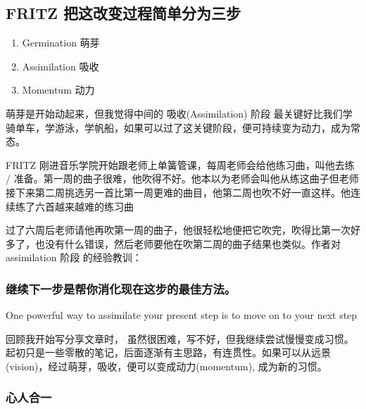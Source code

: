 \hypertarget{fritz-ux628aux8fd9ux6539ux53d8ux8fc7ux7a0bux7b80ux5355ux5206ux4e3aux4e09ux6b65}{%
\subsection{FRITZ
把这改变过程简单分为三步}\label{fritz-ux628aux8fd9ux6539ux53d8ux8fc7ux7a0bux7b80ux5355ux5206ux4e3aux4e09ux6b65}}

\begin{enumerate}
\tightlist
\item
  Germination 萌芽
\item
  Assimilation 吸收
\item
  Momentum 动力
\end{enumerate}

萌芽是开始动起来，但我觉得中间的 吸收(Assimilation) 阶段
最关键好比我们学骑单车，学游泳，学帆船，如果可以过了这关键阶段，便可持续变为动力，成为常态。

FRITZ 刚进音乐学院开始跟老师上单簧管课，每周老师会给他练习曲，叫他去练 /
准备。第一周的曲子很难，他吹得不好。他本以为老师会叫他从练这曲子但老师接下来第二周挑选另一首比第一周更难的曲目，他第二周也吹不好一直这样。他连续练了六首越来越难的练习曲

过了六周后老师请他再吹第一周的曲子，他很轻松地便把它吹完，吹得比第一次好多了，也没有什么错误，然后老师要他在吹第二周的曲子结果也类似。作者对
assimilation 阶段 的经验教训：

\hypertarget{ux7ee7ux7eedux4e0bux4e00ux6b65ux662fux5e2eux4f60ux6d88ux5316ux73b0ux5728ux8fd9ux6b65ux7684ux6700ux4f73ux65b9ux6cd5}{%
\subsubsection{继续下一步是帮你消化现在这步的最佳方法。}\label{ux7ee7ux7eedux4e0bux4e00ux6b65ux662fux5e2eux4f60ux6d88ux5316ux73b0ux5728ux8fd9ux6b65ux7684ux6700ux4f73ux65b9ux6cd5}}

One powerful way to assimilate your present step is to move on to your
next step

回顾我开始写分享文章时，
虽然很困难，写不好，但我继续尝试慢慢变成习惯。起初只是一些零散的笔记，后面逐渐有主思路，有连贯性。如果可以从远景(vision)，经过萌芽，吸收，便可以变成动力(momentum),
成为新的习惯。

\hypertarget{ux5fc3ux4ebaux5408ux4e00}{%
\subsubsection{心人合一}\label{ux5fc3ux4ebaux5408ux4e00}}

